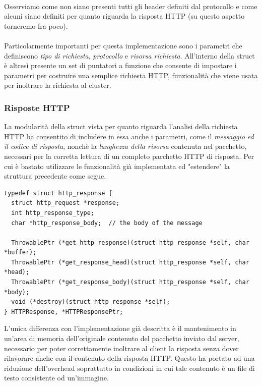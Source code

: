 \documentclass[italian]{tktltiki2}
\begin{document}
\\ 
Osserviamo come non siano presenti tutti gli header definiti dal protocollo e come alcuni siano definiti per quanto riguarda la risposta HTTP (su questo aspetto torneremo fra poco). 
\\
\\
Particolarmente importanti per questa implementazione sono i parametri che definiscono \emph{tipo di richiesta}, \emph{protocollo} e \emph{risorsa richiesta}. All'interno della struct è altresì presente un set di puntatori a funzione che consente di impostare i parametri per costruire una semplice richiesta HTTP, funzionalità che viene usata per inoltrare la richiesta al cluster.
\subsubsection*{Risposte HTTP}
La modularità della struct vista per quanto riguarda l'analisi della richiesta HTTP ha consentito di includere in essa anche i parametri, come il \emph{messaggio ed il codice di risposta}, nonchè la \emph{lunghezza della risorsa} contenuta nel pacchetto, necessari per la corretta lettura di un completo pacchetto HTTP di risposta. Per cui è bastato utilizzare le funzionalità già implementata ed "estendere" la struttura precedente come segue.
\begin{lstlisting}
typedef struct http_response {
  struct http_request *response;                           
  int http_response_type;                                 
  char *http_response_body;  // the body of the message

  ThrowablePtr (*get_http_response)(struct http_response *self, char *buffer);
  ThrowablePtr (*get_response_head)(struct http_response *self, char *head);
  ThrowablePtr (*get_response_body)(struct http_response *self, char *body);
  void (*destroy)(struct http_response *self);
} HTTPResponse, *HTTPResponsePtr;

\end{lstlisting}
L'unica differenza con l'implementazione già descritta è il mantenimento in un'area di memoria dell'originale contenuto del pacchetto inviato dal server, necessario per poter correttamente inoltrare al client la risposta senza dover rilavorare anche con il contenuto della risposta HTTP. Questo ha portato ad una riduzione dell'overhead soprattutto in condizioni in cui tale contenuto è un file di testo consistente od un'immagine.
\end{document}
